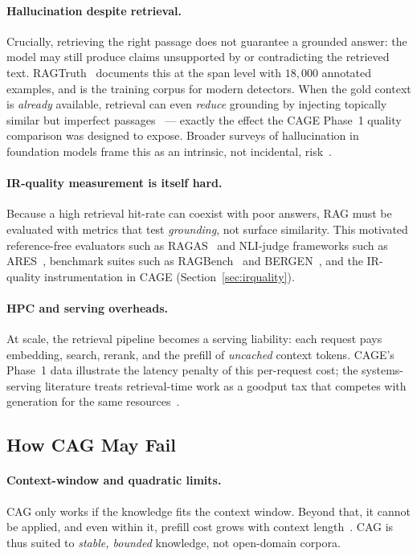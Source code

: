 \documentclass[12pt,a4paper]{article}
\let\cite\citep
\begin{document}
\paragraph{Hallucination despite retrieval.} Crucially, retrieving the right
passage does not guarantee a grounded answer: the model may still produce claims
unsupported by or contradicting the retrieved text. RAGTruth~\cite{ragtruth}
documents this at the span level with $18{,}000$ annotated examples, and is the
training corpus for modern detectors. When the gold context is \emph{already}
available, retrieval can even \emph{reduce} grounding by injecting topically
similar but imperfect passages~\cite{yu2024dontdorag} --- exactly the effect the
CAGE Phase~1 quality comparison was designed to expose. Broader surveys of
hallucination in foundation models frame this as an intrinsic, not incidental,
risk~\cite{zhang2024siren}.

\paragraph{IR-quality measurement is itself hard.} Because a high retrieval
hit-rate can coexist with poor answers, RAG must be evaluated with metrics that
test \emph{grounding}, not surface similarity. This motivated reference-free
evaluators such as RAGAS~\cite{espejel2023ragas} and NLI-judge frameworks such as
ARES~\cite{ares2024}, benchmark suites such as RAGBench~\cite{li2024ragbench} and
BERGEN~\cite{bergen2024}, and the IR-quality instrumentation in CAGE
(Section~\ref{sec:irquality}).

\paragraph{HPC and serving overheads.} At scale, the retrieval pipeline becomes a
serving liability: each request pays embedding, search, rerank, and the prefill of
\emph{uncached} context tokens. CAGE's Phase~1 data illustrate the latency penalty
of this per-request cost; the systems-serving literature treats retrieval-time work
as a goodput tax that competes with generation for the same
resources~\cite{inferenceserving}.

\subsection{How CAG May Fail}
\label{sec:cagfail}

\paragraph{Context-window and quadratic limits.} CAG only works if the knowledge
fits the context window. Beyond that, it cannot be applied, and even within it,
prefill cost grows with context length~\cite{yu2024dontdorag}. CAG is thus suited
to \emph{stable, bounded} knowledge, not open-domain corpora.
\end{document}
